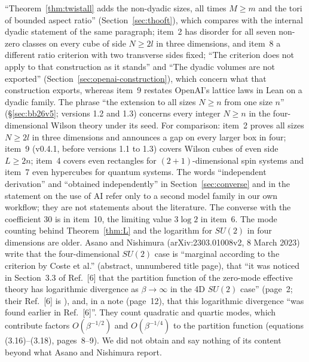 \documentclass[11pt,a4paper]{article}
\theoremstyle{plain}
\theoremstyle{definition}
\theoremstyle{remark}
\numberwithin{equation}{section}
\begin{document}
``Theorem~\ref{thm:twistall} adds the non-dyadic sizes, all times $M\ge m$ and the tori of bounded aspect ratio'' (Section~\ref{sec:thooft}), which compares with the internal dyadic statement of the same paragraph; item~2 has disorder for all seven non-zero classes on every cube of side $N\ge2l$ in three dimensions, and item~8 a different ratio criterion with two transverse sides fixed; ``The criterion does not apply to that construction as it stands'' and ``The dyadic volumes are not exported'' (Section~\ref{sec:openai-construction}), which concern what that construction exports, whereas item~9 restates OpenAI's lattice laws in Lean on a dyadic family.
 The phrase ``the extension to all sizes $N\ge n$ from one size $n$'' (\S\ref{sec:bb26v5}; versions 1.2 and 1.3) concerns every integer $N\ge n$ in the four-dimensional Wilson theory under its seed. For comparison: item~2 proves all sizes $N\ge2l$ in three dimensions and announces a gap on every larger box in four; item~9 (v0.4.1, before versions 1.1 to 1.3) covers Wilson cubes of even side $L\ge2n$; item~4 covers even rectangles for $(2+1)$-dimensional spin systems and item~7 even hypercubes for quantum systems. The words ``independent derivation'' and ``obtained independently'' in Section~\ref{sec:converse} and in the statement on the use of AI refer only to a second model family in our own workflow; they are not statements about the literature. The converse with the coefficient $30$ is in item~10, the limiting value $3\log2$ in item~6.
 The mode counting behind Theorem~\ref{thm:L} and the logarithm for $SU(2)$ in four dimensions are older. Asano and Nishimura \cite{AN23} (arXiv:2303.01008v2, 8 March 2023) write that the four-dimensional $SU(2)$ case is ``marginal according to the criterion by Coste et al.'' (abstract, unnumbered title page), that ``it was noticed in Section~3.3 of Ref.~[6] that the partition function of the zero-mode effective theory has logarithmic divergence as $\beta\to\infty$ in the 4D $SU(2)$ case'' (page~2; their Ref.~[6] is \cite{CGJK85}), and, in a note (page~12), that this logarithmic divergence ``was found earlier in Ref.~[6]''. They count quadratic and quartic modes, which contribute factors $O(\beta^{-1/2})$ and $O(\beta^{-1/4})$ to the partition function (equations (3.16)--(3.18), pages~8--9). We did not obtain \cite{CGJK85} and say nothing of its content beyond what Asano and Nishimura report.
\end{document}
